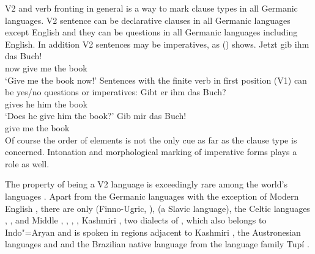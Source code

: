 V2 and verb fronting in general is a way to mark clause types in all Germanic languages. V2 sentence
can be declarative clauses in all Germanic languages except English and they can be questions in all
Germanic languages including English. In addition V2 sentences may be imperatives, as () shows.
\ea
\gll Jetzt gib ihm das Buch!\\
     now give me the book\\\german
\glt `Give me the book now!'
\z
Sentences with the finite verb in first position (V1) can be yes/no questions or imperatives:
\eal
\ex
\gll Gibt er ihm das Buch?\\
     gives he him the book\\\german
\glt `Does he give him the book?'
\ex 
\gll Gib mir das Buch!\\
     give me the book\\
\zl
Of course the order of elements is not the only cue as far as the clause type is
concerned. Intonation and morphological marking of imperative forms plays a role as well.

The property of being a V2 language is exceedingly rare among the world's languages \citep[]{Holmberg2015a}. Apart from the Germanic languages with the exception of 
Modern English \citep{HP86a-ed}, there are only  (Finno-Ugric, \citealp[]{Holmberg2015a}),  \citep[entry~79]{Plank2003b-ed} (a Slavic language), the
Celtic languages  \citep{BK2000a-u},  \citep*[]{BTW2007a-u}, and Middle  \citep{Willis98a},  \parencites[Section~1.3]{Adams1987a-u}[Section~2.1.2]{Roberts93a-u}[Chapter~2]{Vance97a-u}, 
\citep[Section~3.3.2]{Fontana97a-u}, 
 \citep{Poletto2002a-u,Anderson2006a-u}, Kashmiri
\citep[Chapter~4]{Bhatt99a-u}, two dialects of , which also belongs to Indo"=Aryan
and is spoken in regions adjacent to Kashmiri \citep{Hendriksen90a}, the Austronesian
languages  and  \citep[]{Ross2004a-u} and the Brazilian native
language  from the language family Tupí \citep{Storto2003a-u}.



